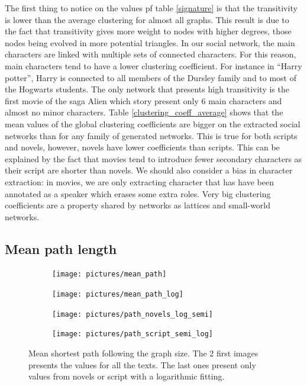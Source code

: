 \documentclass[a4paper, 12pt]{report}
\begin{document}
The first thing to notice on the values pf table \ref{signature} is that the transitivity is lower than the average clustering for almost all graphs. This result is due to the fact that transitivity gives more weight to nodes with higher degrees, those nodes being evolved in more potential triangles. In our social network, the main characters are linked with multiple sets of connected characters. For this reason, main characters tend to have a lower clustering coefficient. For instance in ``Harry potter'', Harry is connected to all members of the Dursley family and to most of the Hogwarts students. The only network that presents high transitivity is the first movie of the saga Alien which story present only 6 main characters and almost no minor characters. Table \ref{clustering_coeff_average} shows that the mean values of the global clustering coefficients are bigger on the extracted social networks than for any family of generated networks. This is true for both scripts and novels, however, novels have lower coefficients than scripts. This can be explained by the fact that movies tend to introduce fewer secondary characters as their script are shorter than novels. We should also consider a bias in character extraction: in movies, we are only extracting character that has have been annotated as a speaker which erases some extra roles. Very big clustering coefficients are a property shared by networks as lattices and small-world networks. \\


\subsection{Mean path length}
\begin{figure}
\begin{subfigure}{.49\textwidth}
\centering
\texttt{[image: pictures/mean\_path]}
\end{subfigure}
\hfill
\begin{subfigure}{.49\textwidth}
\centering
\texttt{[image: pictures/mean\_path\_log]}
\end{subfigure}
\hfill
\begin{subfigure}{.49\textwidth}
\centering
\texttt{[image: pictures/path\_novels\_log\_semi]}
\end{subfigure}
\hfill
\begin{subfigure}{.49\textwidth}
\centering
\texttt{[image: pictures/path\_script\_semi\_log]}
\end{subfigure}
\caption{Mean shortest path following the graph size. The 2 first images presents the values for all the texts. The last ones present only values from novels or script with a logarithmic fitting. }
\label{mean_path}
\end{figure}
\end{document}
